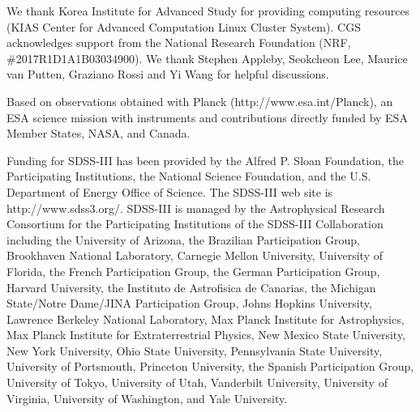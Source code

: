 \documentclass[iop]{emulateapj}
\begin{document}
We thank Korea Institute for Advanced Study for providing computing resources (KIAS Center for Advanced Computation Linux Cluster System).
CGS acknowledges support from the National Research Foundation (NRF,  \#2017R1D1A1B03034900). 
We thank Stephen Appleby, Seokcheon Lee, Maurice van Putten, Graziano Rossi and Yi Wang for helpful discussions.

Based on observations obtained with Planck (http://www.esa.int/Planck), 
an ESA science mission with instruments and contributions directly funded by 
ESA Member States, NASA, and Canada.


Funding for SDSS-III has been provided by the Alfred P. Sloan Foundation, the Participating Institutions, the
National Science Foundation, and the U.S. Department of Energy Office of Science. 
The SDSS-III web site is http://www.sdss3.org/. 
SDSS-III is managed by the Astrophysical Research Consortium for the Participating Institutions
of the SDSS-III Collaboration including the University of Arizona, the Brazilian Participation Group, Brookhaven
National Laboratory, Carnegie Mellon University, University of Florida, the French Participation Group, 
the German Participation Group, Harvard University, the Instituto de Astrofisica de Canarias, the Michigan State/Notre
Dame/JINA Participation Group, Johns Hopkins University, Lawrence Berkeley National Laboratory, Max Planck
Institute for Astrophysics, Max Planck Institute for Extraterrestrial Physics, New Mexico State University, New
York University, Ohio State University, Pennsylvania State
University, University of Portsmouth, Princeton University,
the Spanish Participation Group, University of Tokyo, University of Utah, Vanderbilt University, University of Virginia, 
University of Washington, and Yale University.

\

\

\
\end{document}
